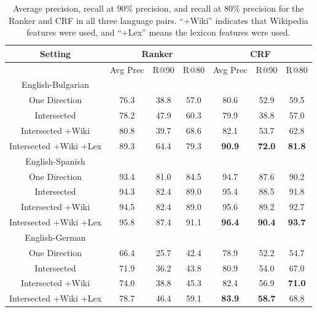 \documentclass[11pt,letterpaper]{article}
\begin{document}
\begin{table}[ht]
\begin{center}
\begin{tabular}{|c||c|c|c||c|c|c|}
\hline
Setting           & \multicolumn{3}{|c||}{Ranker} & \multicolumn{3}{|c|}{CRF} \\
\hline
                  & Avg Prec & R@90 & R@80
                  & Avg Prec & R@90 & R@80\\
\hline
English-Bulgarian & & & & & & \\
\hline
One Direction          & 76.3  & 38.8  & 57.0    & 80.6  & 52.9  & 59.5 \\
Intersected            & 78.2  & 47.9  & 60.3    & 79.9  & 38.8  & 57.0 \\
Intersected +Wiki      & 80.8  & 39.7  & 68.6    & 82.1  & 53.7  & 62.8 \\
Intersected +Wiki +Lex & 89.3  & 64.4  & 79.3    & {\bf 90.9}  & {\bf 72.0}  & {\bf 81.8} \\
\hline
English-Spanish & & & & & & \\
\hline
One Direction          & 93.4  & 81.0  & 84.5    & 94.7  & 87.6  & 90.2 \\
Intersected            & 94.3  & 82.4  & 89.0    & 95.4  & 88.5  & 91.8 \\
Intersected +Wiki      & 94.5  & 82.4  & 89.0    & 95.6  & 89.2  & 92.7 \\
Intersected +Wiki +Lex & 95.8  & 87.4  & 91.1    & {\bf 96.4}  & {\bf 90.4}  & {\bf 93.7} \\
\hline
English-German & & & & & & \\
\hline
One Direction          & 66.4  & 25.7  & 42.4    & 78.9  & 52.2  & 54.7 \\
Intersected            & 71.9  & 36.2  & 43.8    & 80.9  & 54.0  & 67.0 \\
Intersected +Wiki      & 74.0  & 38.8  & 45.3    & 82.4  & 56.9  & {\bf 71.0} \\
Intersected +Wiki +Lex & 78.7  & 46.4  & 59.1    & {\bf 83.9}  & {\bf 58.7}  & 68.8 \\
\hline
\end{tabular}
\end{center}
\caption{Average precision, recall at 90\% precision, and recall at 80\%
precision for the Ranker and CRF in all three language pairs.  ``+Wiki''
indicates that Wikipedia features were used, and ``+Lex'' means the lexicon
features were used.}
\label{table:featurecompare}
\end{table}
\end{document}
